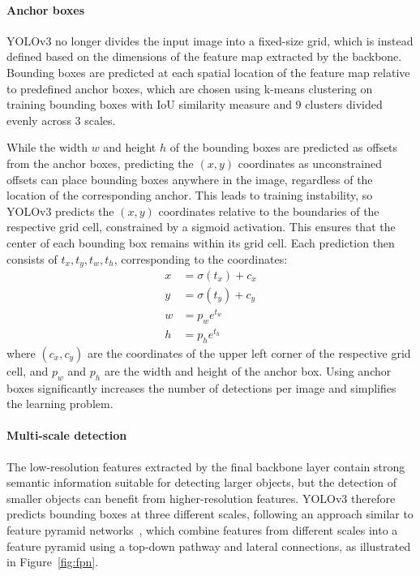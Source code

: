 \paragraph{Anchor boxes} YOLOv3 no longer divides the input image into a fixed-size grid, which is instead defined based on the dimensions of the feature map extracted by the backbone. Bounding boxes are predicted at each spatial location of the feature map relative to predefined anchor boxes, which are chosen using k-means clustering on training bounding boxes with IoU similarity measure and 9 clusters divided evenly across 3 scales.

While the width $w$ and height $h$ of the bounding boxes are predicted as offsets from the anchor boxes, predicting the $(x, y)$ coordinates as unconstrained offsets can place bounding boxes anywhere in the image, regardless of the location of the corresponding anchor. This leads to training instability, so YOLOv3 predicts the $(x, y)$ coordinates relative to the boundaries of the respective grid cell, constrained by a sigmoid activation. This ensures that the center of each bounding box remains within its grid cell. Each prediction then consists of $t_x, t_y, t_w, t_h$, corresponding to the coordinates:
\begin{align}
    x &= \sigma(t_x) + c_x \\
    y &= \sigma(t_y) + c_y \\
    w &= p_w e^{t_w} \\
    h &= p_h e^{t_h}
\end{align}
where $(c_x, c_y)$ are the coordinates of the upper left corner of the respective grid cell, and $p_w$ and $p_h$ are the width and height of the anchor box. Using anchor boxes significantly increases the number of detections per image and simplifies the learning problem.~\cite{Redmon2017, Redmon2018}

\paragraph{Multi-scale detection} The low-resolution features extracted by the final backbone layer contain strong semantic information suitable for detecting larger objects, but the detection of smaller objects can benefit from higher-resolution features. YOLOv3 therefore predicts bounding boxes at three different scales, following an approach similar to feature pyramid networks~\cite{Lin2017}, which combine features from different scales into a feature pyramid using a top-down pathway and lateral connections, as illustrated in Figure~\ref{fig:fpn}.

